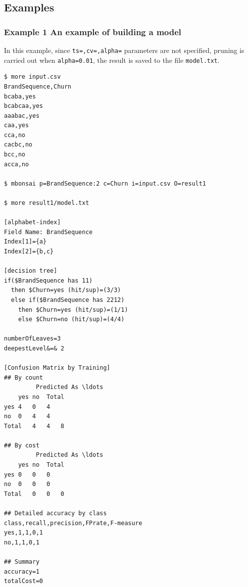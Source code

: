 \subsection{Examples}
\subsubsection{Example 1  An example of building a model }

In this example, since \verb|ts=,cv=,alpha=| parameters are not specified, pruning is carried out when \verb|alpha=0.01|,  the result is saved to  the file \verb|model.txt|.

\begin{Verbatim}[baselinestretch=0.7,frame=single]
$ more input.csv
BrandSequence,Churn
bcaba,yes
bcabcaa,yes
aaabac,yes
caa,yes
cca,no
cacbc,no
bcc,no
acca,no

$ mbonsai p=BrandSequence:2 c=Churn i=input.csv O=result1

$ more result1/model.txt

[alphabet-index]
Field Name: BrandSequence
Index[1]={a}
Index[2]={b,c}

[decision tree]
if($BrandSequence has 11)
  then $Churn=yes (hit/sup)=(3/3)
  else if($BrandSequence has 2212)
    then $Churn=yes (hit/sup)=(1/1)
    else $Churn=no (hit/sup)=(4/4)

numberOfLeaves=3
deepestLevel&=& 2

[Confusion Matrix by Training]
## By count
         Predicted As \ldots
	yes	no	Total
yes	4	0	4
no	0	4	4
Total	4	4	8

## By cost
         Predicted As \ldots
	yes	no	Total
yes	0	0	0
no	0	0	0
Total	0	0	0

## Detailed accuracy by class
class,recall,precision,FPrate,F-measure
yes,1,1,0,1
no,1,1,0,1

## Summary
accuracy=1
totalCost=0


\end{Verbatim}
